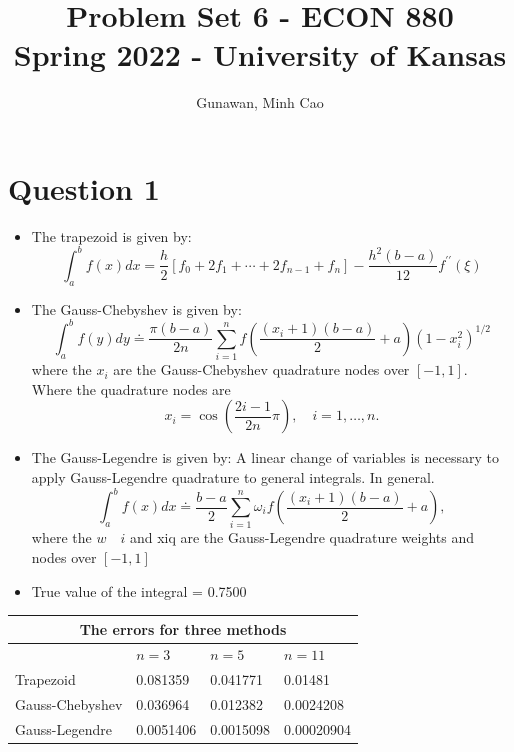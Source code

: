 \documentclass[11pt]{article}
\title{Problem Set 6 - ECON 880\\
	\small Spring 2022 - University of Kansas}
\author{Gunawan, Minh Cao}
\newcommand{\1}{\mathbbm{1}}
\begin{document}
\maketitle	
\section*{Question 1}

\begin{itemize}
\item The trapezoid is given by:
$$\int_{a}^{b} f(x) d x=\frac{h}{2}\left[f_{0}+2 f_{1}+\cdots+2 f_{n-1}+f_{n}\right]-\frac{h^{2}(b-a)}{12} f^{\prime \prime}(\xi)$$
\item The Gauss-Chebyshev is given by:
$$
\int_{a}^{b} f(y) d y \doteq \frac{\pi(b-a)}{2 n} \sum_{i=1}^{n} f\left(\frac{\left(x_{i}+1\right)(b-a)}{2}+a\right)\left(1-x_{i}^{2}\right)^{1 / 2}
$$
where the $x_i$ are the Gauss-Chebyshev quadrature nodes over $[-1,1]$. Where the quadrature nodes are
$$
x_{i}=\cos \left(\frac{2 i-1}{2 n} \pi\right), \quad i=1, \ldots, n .
$$
\item The Gauss-Legendre is given by:
A linear change of variables is necessary to apply Gauss-Legendre quadrature to general integrals. In general.
$$
\int_{a}^{b} f(x) d x \doteq \frac{b-a}{2} \sum_{i=1}^{n} \omega_{i} f\left(\frac{\left(x_{i}+1\right)(b-a)}{2}+a\right),
$$
where the $w \quad i$ and xiq are the Gauss-Legendre quadrature weights and nodes over $[-1,1]$



\item True value of the integral = 0.7500

\end{itemize}




\begin{tabular}{ |p{3cm}||p{3cm}|p{3cm}|p{3cm}|  }
 \hline
 \multicolumn{4}{|c|}{The errors for three methods} \\
 \hline
               & $n=3$ &$n=5$&$n=11$\\
 \hline
    Trapezoid      & 0.081359     &0.041771 &   0.01481\\
     Gauss-Chebyshev   &     0.036964    & 0.012382     &0.0024208\\
 Gauss-Legendre   &0.0051406   & 0.0015098 & 0.00020904\\
  \hline
\end{tabular}
\end{document}
